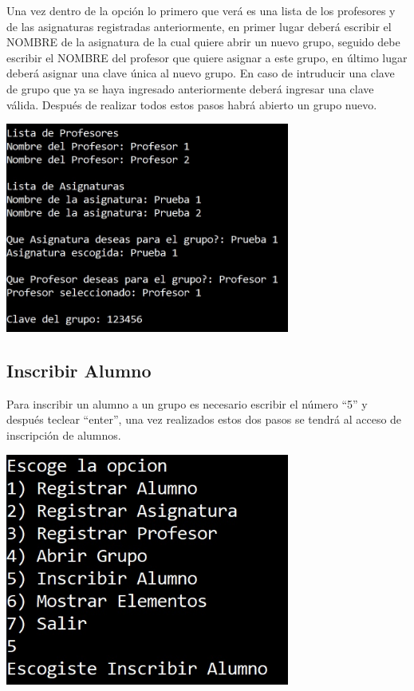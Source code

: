 \documentclass[12pt]{report}
\begin{document}
\newpage
Una vez dentro de la opción lo primero que verá es una lista de los profesores y de las asignaturas registradas anteriormente, en primer lugar deberá escribir el NOMBRE de la asignatura de la cual quiere abrir un nuevo grupo, seguido debe escribir el NOMBRE del profesor que quiere asignar a este grupo, en último lugar deberá asignar una clave única al nuevo grupo. En caso de intruducir una clave de grupo que ya se haya ingresado anteriormente deberá ingresar una clave válida. Después de realizar todos estos pasos habrá abierto un grupo nuevo.

\begin{center}
    \includegraphics[width=0.7\textwidth]{img/Opcion 4 P2.jpg}
\end{center}


\newpage
\subsection*{Inscribir Alumno}
Para inscribir un alumno a un grupo es necesario escribir el número ``5'' y después teclear ``enter'', una vez realizados estos dos pasos se tendrá al acceso de inscripción de alumnos.

\begin{center}
    \includegraphics[width=0.7\textwidth]{img/Opcion 5 P1.jpg}
\end{center}
\end{document}
